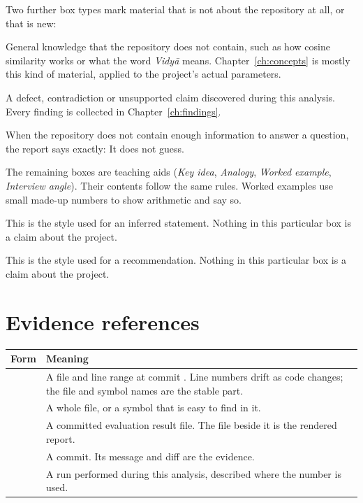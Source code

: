 Two further box types mark material that is not about the repository at all, or that is new:

\begin{description}[style=nextline]
  \item[Background --- grey boxes.] General knowledge that the repository does not contain, such as how cosine similarity works or what the word \emph{Vidy\=a} means. Chapter~\ref{ch:concepts} is mostly this kind of material, applied to the project's actual parameters.
  \item[Finding --- red boxes.] A defect, contradiction or unsupported claim discovered during this analysis. Every finding is collected in Chapter~\ref{ch:findings}.
\end{description}

When the repository does not contain enough information to answer a question, the report says exactly: \NotDet{} It does not guess.

The remaining boxes are teaching aids (\emph{Key idea}, \emph{Analogy}, \emph{Worked example}, \emph{Interview angle}). Their contents follow the same rules. Worked examples use small made-up numbers to show arithmetic and say so.

\begin{inferred}
This is the style used for an inferred statement. Nothing in this particular box is a claim about the project.
\end{inferred}

\begin{recommended}
This is the style used for a recommendation. Nothing in this particular box is a claim about the project.
\end{recommended}

\section*{Evidence references}

\begin{center}
\begin{tabularx}{\textwidth}{@{}p{6.4cm}L@{}}
\toprule
\textbf{Form} & \textbf{Meaning}\\
\midrule
{} & A file and line range at commit . Line numbers drift as code changes; the file and symbol names are the stable part.\\
 & A whole file, or a symbol that is easy to find in it.\\
 & A committed evaluation result file. The  file beside it is the rendered report.\\
 & A commit. Its message and diff are the evidence.\\
 & A run performed during this analysis, described where the number is used.\\
\bottomrule
\end{tabularx}
\end{center}

